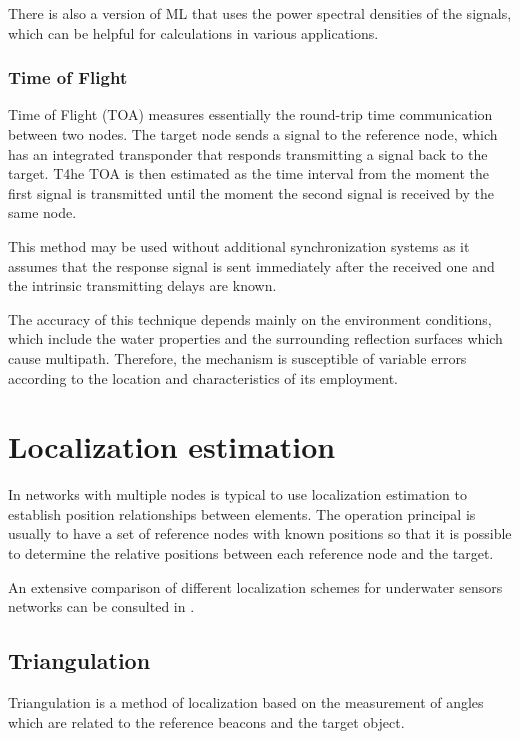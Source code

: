 There is also a version of ML that uses the power spectral densities of the signals, which can be helpful for calculations in various applications. 

\subsubsection{Time of Flight}

Time of Flight (TOA) measures essentially the round-trip time communication between two nodes. The target node sends a signal to the reference node, which has an integrated transponder that responds transmitting a signal back to the target. T4he TOA is then estimated as the time interval from the moment the first signal is transmitted until the moment the second signal is received by the same node. 

This method may be used without additional synchronization systems as it assumes that the response signal is sent immediately after the received one and the intrinsic transmitting delays are known.

The accuracy of this technique depends mainly on the environment conditions, which include the water properties and the surrounding reflection surfaces which cause multipath. Therefore, the mechanism is susceptible of variable errors according to the location and characteristics of its employment.


\section{Localization estimation}

In networks with multiple nodes is typical to use localization estimation to establish position relationships between elements. The operation principal is usually to have a set of reference nodes with known positions so that it is possible to determine the relative positions between each reference node and the target. 

An extensive comparison of different localization schemes for underwater sensors networks can be consulted in \cite{suvey-loc}.

\subsection{Triangulation}

Triangulation is a method of localization based on the measurement of angles which are related to the reference beacons and the target object. 

